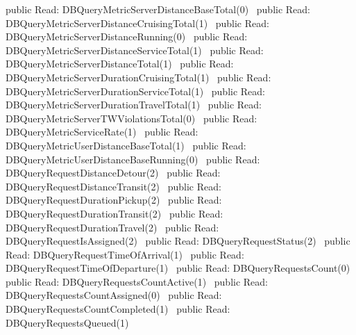 public \LA{}Read: DBQueryMetricServerDistanceBaseTotal(0)~{\nwtagstyle{}}\RA{}
public \LA{}Read: DBQueryMetricServerDistanceCruisingTotal(1)~{\nwtagstyle{}}\RA{}
public \LA{}Read: DBQueryMetricServerDistanceRunning(0)~{\nwtagstyle{}}\RA{}
public \LA{}Read: DBQueryMetricServerDistanceServiceTotal(1)~{\nwtagstyle{}}\RA{}
public \LA{}Read: DBQueryMetricServerDistanceTotal(1)~{\nwtagstyle{}}\RA{}
public \LA{}Read: DBQueryMetricServerDurationCruisingTotal(1)~{\nwtagstyle{}}\RA{}
public \LA{}Read: DBQueryMetricServerDurationServiceTotal(1)~{\nwtagstyle{}}\RA{}
public \LA{}Read: DBQueryMetricServerDurationTravelTotal(1)~{\nwtagstyle{}}\RA{}
public \LA{}Read: DBQueryMetricServerTWViolationsTotal(0)~{\nwtagstyle{}}\RA{}
public \LA{}Read: DBQueryMetricServiceRate(1)~{\nwtagstyle{}}\RA{}
public \LA{}Read: DBQueryMetricUserDistanceBaseTotal(1)~{\nwtagstyle{}}\RA{}
public \LA{}Read: DBQueryMetricUserDistanceBaseRunning(0)~{\nwtagstyle{}}\RA{}
public \LA{}Read: DBQueryRequestDistanceDetour(2)~{\nwtagstyle{}}\RA{}
public \LA{}Read: DBQueryRequestDistanceTransit(2)~{\nwtagstyle{}}\RA{}
public \LA{}Read: DBQueryRequestDurationPickup(2)~{\nwtagstyle{}}\RA{}
public \LA{}Read: DBQueryRequestDurationTransit(2)~{\nwtagstyle{}}\RA{}
public \LA{}Read: DBQueryRequestDurationTravel(2)~{\nwtagstyle{}}\RA{}
public \LA{}Read: DBQueryRequestIsAssigned(2)~{\nwtagstyle{}}\RA{}
public \LA{}Read: DBQueryRequestStatus(2)~{\nwtagstyle{}}\RA{}
public \LA{}Read: DBQueryRequestTimeOfArrival(1)~{\nwtagstyle{}}\RA{}
public \LA{}Read: DBQueryRequestTimeOfDeparture(1)~{\nwtagstyle{}}\RA{}
public \LA{}Read: DBQueryRequestsCount(0)~{\nwtagstyle{}}\RA{}
public \LA{}Read: DBQueryRequestsCountActive(1)~{\nwtagstyle{}}\RA{}
public \LA{}Read: DBQueryRequestsCountAssigned(0)~{\nwtagstyle{}}\RA{}
public \LA{}Read: DBQueryRequestsCountCompleted(1)~{\nwtagstyle{}}\RA{}
public \LA{}Read: DBQueryRequestsQueued(1)~{\nwtagstyle{}}\RA{}
